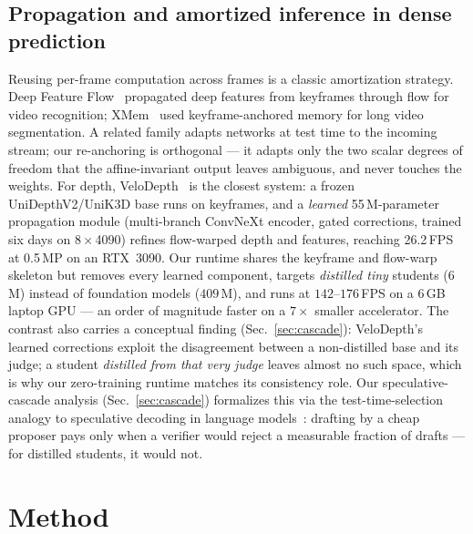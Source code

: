 \documentclass[10pt,twocolumn]{article}
\begin{document}
\subsection{Propagation and amortized inference in dense prediction}
Reusing per-frame computation across frames is a classic amortization
strategy. Deep Feature Flow~\cite{dff} propagated deep features from
keyframes through flow for video recognition; XMem~\cite{xmem} used
keyframe-anchored memory for long video segmentation. A related family
adapts networks at test time to the incoming stream; our re-anchoring is
orthogonal --- it adapts only the two scalar degrees of freedom that the
affine-invariant output leaves ambiguous, and never touches the weights.
For depth,
VeloDepth~\cite{velodepth} is the closest system: a frozen
UniDepthV2/UniK3D base runs on keyframes, and a \emph{learned} 55\,M-parameter
propagation module (multi-branch ConvNeXt encoder, gated corrections, trained
six days on $8\times$4090) refines flow-warped depth and features, reaching
26.2\,FPS at 0.5\,MP on an RTX~3090. Our runtime shares the keyframe and
flow-warp skeleton but removes every learned component, targets
\emph{distilled tiny} students (6\,M) instead of foundation models
($409$\,M), and runs at $142$--$176$\,FPS on a $6$\,GB laptop GPU ---
an order of magnitude faster on a $7\times$ smaller accelerator. The
contrast also carries a conceptual finding (Sec.~\ref{sec:cascade}):
VeloDepth's learned corrections exploit the disagreement between a
non-distilled base and its judge; a student \emph{distilled from that very
judge} leaves almost no such space, which is why our zero-training runtime
matches its consistency role. Our speculative-cascade analysis
(Sec.~\ref{sec:cascade}) formalizes this via the test-time-selection
analogy to speculative decoding in language
models~\cite{specdec}: drafting by a cheap proposer pays only when a
verifier would reject a measurable fraction of drafts --- for distilled
students, it would not.

\section{Method}
\label{sec:method}
\end{document}
